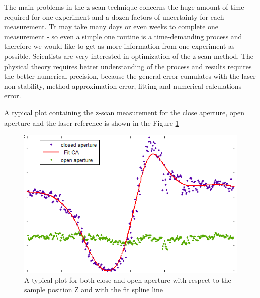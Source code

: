 \documentclass[12pt,twoside,a4paper]{article}
\numberwithin{equation}{subsection}
\numberwithin{figure}{subsection}
\begin{document}
The main problems in the z-scan technique concerns the huge amount of time required for one experiment and a dozen factors of uncertainty
for each measurement. Tt may take many days or even weeks to complete one measurement - so even a simple one routine is a time-demanding
process and therefore we would like to get as more information from one experiment as possible.
Scientists are very interested in optimization of the z-scan method. The physical theory requires better understanding of the process and
results requires the better numerical precision, because the general error cumulates with the laser non stability, method
approximation error, fitting and numerical calculations error.

A typical plot containing the z-scan measurement for the close aperture, open aperture and the laser reference is shown in the Figure
\ref{fig:zscan_both}

\begin{figure} 
  \includegraphics{img/zscan_both.png}
  \caption{A typical plot for both close and open aperture with respect to the sample position Z and with the fit spline line
  \label{fig:zscan_both}} 
\end{figure}
\end{document}
